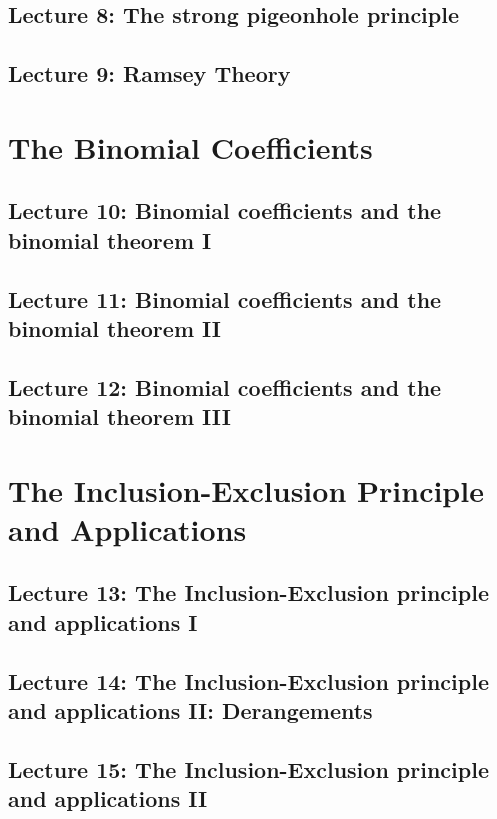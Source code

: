 \documentclass{report}
\begin{document}
\section{Lecture 8: The strong pigeonhole principle}

\section{Lecture 9: Ramsey Theory}

\setcounter{chapter}{4}

\chapter{The Binomial Coefficients}

\section{Lecture 10: Binomial coefficients and the binomial theorem I}

\section{Lecture 11: Binomial coefficients and the binomial theorem II}

\section{Lecture 12: Binomial coefficients and the binomial theorem III}

\chapter{The Inclusion-Exclusion Principle and Applications}

\section{Lecture 13: The Inclusion-Exclusion principle and applications I}

\section{Lecture 14: The Inclusion-Exclusion principle and applications II: Derangements}

\section{Lecture 15: The Inclusion-Exclusion principle and applications II}
\end{document}
